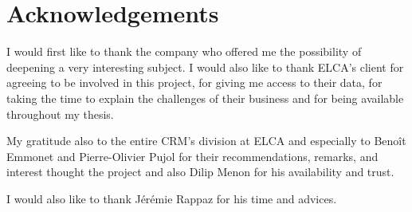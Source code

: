 \chapter*{Acknowledgements}

\vspace{0.5cm}

I would first like to thank the company who offered me the possibility of deepening a very interesting subject. I would also like to thank ELCA's client for agreeing to be involved in this project, for giving me access to their data, for taking the time to explain the challenges of their business and for being available throughout my thesis.

\par

My gratitude also to the entire CRM's division at ELCA and especially to Benoît Emmonet and Pierre-Olivier Pujol for their recommendations, remarks, and interest thought the project and also Dilip Menon for his availability and trust.
\par

I would also like to thank Jérémie Rappaz for his time and advices.